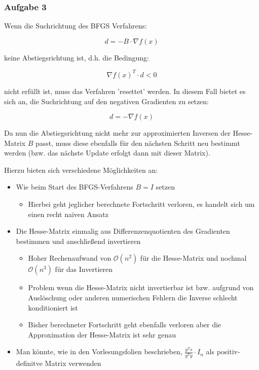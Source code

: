 \documentclass[a4paper, 12pt]{report}
\begin{document}
\newpage

\subsubsection{Aufgabe 3}
Wenn die Suchrichtung des BFGS Verfahrens:

$$d = -B\cdot \nabla f(x) $$

keine Abstiegsrichtung ist, d.h. die Bedingung:

$$\nabla f(x)^T \cdot d < 0 $$

nicht erfüllt ist, muss das Verfahren 'resettet' werden. In diesem Fall bietet es sich an, die Suchrichtung auf den
negativen Gradienten zu setzen:

$$d = -\nabla f(x)$$

Da nun die Abstiegsrichtung nicht mehr zur approximierten Inversen der Hesse-Matrix $B$ passt, muss diese ebenfalls für
den nächsten Schritt neu bestimmt werden (bzw. das nächste Update erfolgt dann mit dieser Matrix).\par
Hierzu bieten sich verschiedene Möglichkeiten an:

\begin{itemize}
  \item Wie beim Start des BFGS-Verfahrens $B = I$ setzen
  \begin{itemize}
    \item Hierbei geht jeglicher berechnete Fortschritt verloren, es handelt sich um einen recht naiven Ansatz
  \end{itemize}
  \item Die Hesse-Matrix einmalig aus Differenzenquotienten des Gradienten bestimmen und anschließend invertieren
  \begin{itemize}
    \item Hoher Rechenaufwand von $\mathcal{O}(n^2)$ für die Hesse-Matrix und nochmal $\mathcal{O}(n^3)$ für das Invertieren
    \item Problem wenn die Hesse-Matrix nicht invertierbar ist bzw. aufgrund von Auslöschung oder anderen numerischen Fehlern
    die Inverse schlecht konditioniert ist
    \item Bisher berechneter Fortschritt geht ebenfalls verloren aber die Approximation der Hesse-Matrix ist sehr genau
  \end{itemize}
  \item Man könnte, wie in den Vorlesungsfolien beschrieben,  $\frac{y^Ts}{y^Ty}\cdot I_n$ als positiv-definitve Matrix verwenden
\end{itemize}
\end{document}
